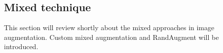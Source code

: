 \subsection{Mixed technique} 
This section will review shortly about the mixed approaches in image augmentation. Custom mixed augmentation and RandAugment will be introduced.


